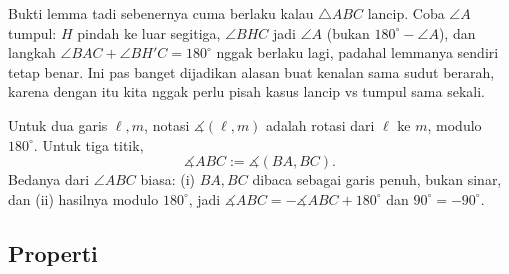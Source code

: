 \documentclass[letterpaper, 13pt]{scrartcl}
\newcommand{\titik}[1]{\foreach \p in {#1} \filldraw (\p) circle (1.4pt);}
\begin{document}
\noindent
\begin{minipage}[t]{175pt}
\vspace{0pt}
\centering
{}
\end{minipage}\hfill
\begin{minipage}[t]{\dimexpr\textwidth-175pt-16pt\relax}
\vspace{0pt}
Bukti lemma tadi sebenernya cuma berlaku kalau $\triangle ABC$ lancip. Coba $\angle A$ tumpul: $H$ pindah ke luar segitiga, $\angle BHC$ jadi $\angle A$ (bukan $180^\circ - \angle A$), dan langkah $\angle BAC + \angle BH'C = 180^\circ$ nggak berlaku lagi, padahal lemmanya sendiri tetap benar. Ini pas banget dijadikan alasan buat kenalan sama sudut berarah, karena dengan itu kita nggak perlu pisah kasus lancip vs tumpul sama sekali.
\end{minipage}
\par\bigskip


\begin{definition*}
Untuk dua garis $\ell, m$, notasi $\measuredangle(\ell, m)$ adalah rotasi dari $\ell$ ke $m$, modulo $180^\circ$. Untuk tiga titik,
\[
\measuredangle ABC := \measuredangle(BA, BC).
\]
Bedanya dari $\angle ABC$ biasa: (i) $BA, BC$ dibaca sebagai garis penuh, bukan sinar, dan (ii) hasilnya modulo $180^\circ$, jadi $\measuredangle ABC = -\measuredangle ABC + 180^\circ$ dan $90^\circ = -90^\circ$.
\end{definition*}

\subsection{Properti}
\end{document}

